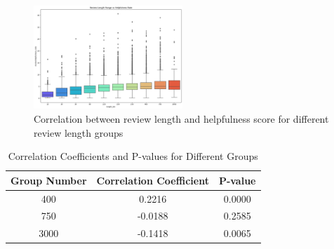 \begin{figure}[H]
    \centering
    \includegraphics[width=0.5\textwidth]{./figures/h1_scatter.png}
    \caption{Correlation between review length and helpfulness score for different review length groups}
    \label{fig:h1_scatter}
\end{figure}

\begin{table}[H]
    \centering
    \caption{Correlation Coefficients and P-values for Different Groups}
    \begin{tabular}{|c|c|c|}
    \hline
    Group Number & Correlation Coefficient & P-value \\
    \hline
    400 & 0.2216 & 0.0000 \\
    \hline
    750 & -0.0188 & 0.2585 \\
    \hline
    3000 & -0.1418 & 0.0065 \\
    \hline
    \end{tabular}
    \end{table}
\label{corr_groups}

